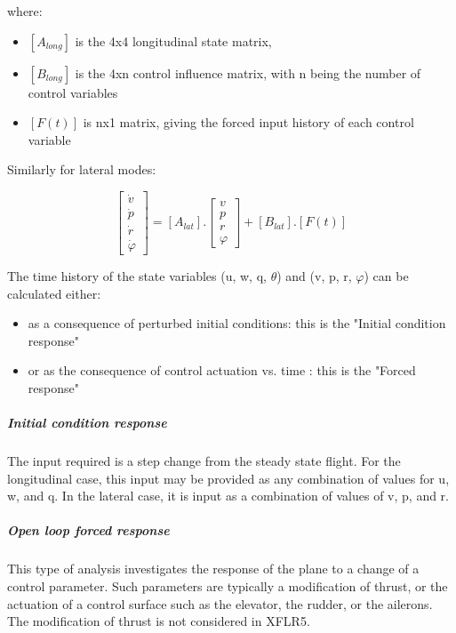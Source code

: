 \documentclass[a4paper,twoside,12pt,dvips]{article}
\begin{document}
where:

\begin{itemize}
\item $\left[A_{long}\right]$ is the 4x4 longitudinal state matrix,
\item $\left[B_{long}\right]$ is the 4xn control influence matrix,
with n being the number of control variables
\item $\left[F(t)\right]$ is nx1 matrix, giving the forced input
history of each control variable
\end{itemize}

Similarly for lateral modes:

$$\left[\begin{matrix} \dot{v} \\ \dot{p} \\ \dot{r} \\ \dot{\varphi} \end{matrix}\right] = \left[A_{lat}\right] . \left[\begin{matrix} v \\ p \\ r \\ \varphi \end{matrix}\right] + \left[B_{lat}\right] . \left[F(t)\right]$$

The time history of the state variables (u, w, q, $\theta$)
and (v, p, r, $\varphi$) can be calculated either:
\begin{itemize}
\item as a consequence of perturbed initial conditions: this is
the "Initial condition response"
\item or as the consequence of control actuation vs. time : this is
the "Forced response"
\end{itemize}

\subparagraph{Initial condition response}

The input required is a step change from the steady state flight. For
the longitudinal case, this input may be provided as any combination
of values for u, w, and q. In the lateral case, it is input as a
combination of values of v, p, and r.

\subparagraph{Open loop forced response}

This type of analysis investigates the response of the plane to a
change of a control parameter. Such parameters are typically a
modification of thrust, or the actuation of a control surface such as
the elevator, the rudder, or the ailerons. The modification of thrust
is not considered in XFLR5.
\end{document}
